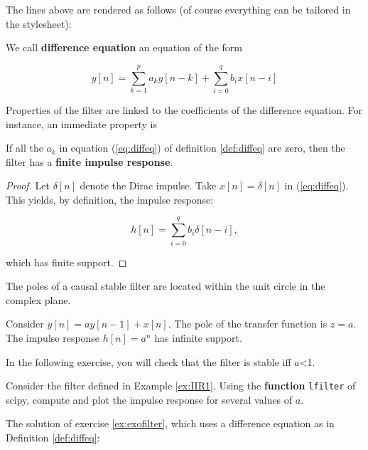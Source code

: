     The lines above are rendered as follows (of course everything can be
tailored in the stylesheet): %
\begin{definition}
\label{def:diffeq} We call \textbf{difference equation} an equation of
the form

\begin{equation}
\label{eq:diffeq}
y[n]= \sum_{k=1}^{p} a_k y[n-k] + \sum_{i=0}^q b_i x[n-i]
\end{equation}

\end{definition} %
Properties of the filter are linked to
the coefficients of the difference equation. For instance, an immediate
property is %
\begin{property}
If all the \(a_k\) in equation (\ref{eq:diffeq}) of definition
\ref{def:diffeq} are zero, then the filter has a \textbf{finite impulse
response}. \end{property} %
\begin{proof} Let
\(\delta[n]\) denote the Dirac impulse. Take \(x[n]=\delta[n]\) in
(\ref{eq:diffeq}). This yields, by definition, the impulse response:

\begin{equation}
\label{eq:fir}
h[n]= \sum_{i=0}^q b_i \delta[n-i],
\end{equation}

which has finite support. \end{proof}
%
\begin{theorem} The poles of a causal stable filter are
located within the unit circle in the complex plane.
\end{theorem} %
\begin{example} \label{ex:IIR1}
Consider \(y[n]= a y[n-1] + x[n]\). The pole of the transfer function is
\(z=a\). The impulse response \(h[n]=a^n\) has infinite support.
\end{example}

In the following exercise, you will check that the filter is stable iff
\(a\)\textless{}1. %
\begin{exercise}\label{ex:exofilter}
Consider the filter defined in Example \ref{ex:IIR1}. Using the
\textbf{function} \texttt{lfilter} of scipy, compute and plot the
impulse response for several values of \(a\). \end{exercise}

    \begin{listing}
The solution of exercise \ref{ex:exofilter}, which uses a difference equation as in Definition \ref{def:diffeq}:
\end{listing}

